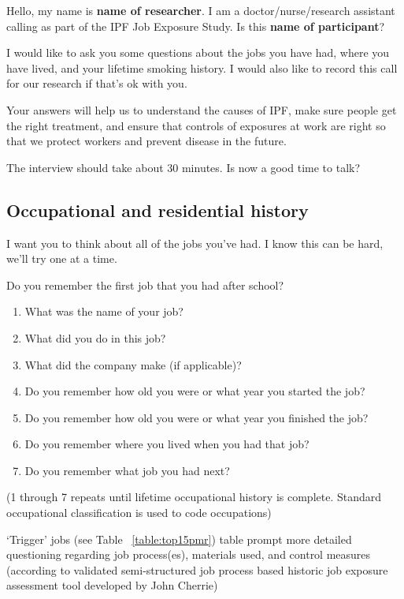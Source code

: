 \documentclass[a4paper,10pt]{article}
\begin{document}
Hello, my name is \textbf{name of researcher}. I am a doctor/nurse/research assistant calling as part of the IPF Job Exposure Study. Is this \textbf{name of participant}? 

I would like to ask you some questions about the jobs you have had, where you have lived, and your lifetime smoking history. I would also like to record this call for our research if that's ok with you.  

Your answers will help us to understand the causes of IPF, make sure people get the right treatment, and ensure that controls of exposures at work are right so that we protect workers and prevent disease in the future.  

The interview should take about 30 minutes. Is now a good time to talk?

\subsection{Occupational and residential history} 

I want you to think about all of the jobs you've had. I know this can be hard, we'll try one at a time. 

Do you remember the first job that you had after school?

\begin{enumerate}
\item  What was the name of your job?
\item  What did you do in this job?
\item  What did the company make (if applicable)?
\item  Do you remember how old you were or what year you started the job?
\item  Do you remember how old you were or what year you finished the job?
\item  Do you remember where you lived when you had that job?
\item  Do you remember what job you had next?
\end{enumerate}

(1 through 7 repeats until lifetime occupational history is complete. Standard occupational classification is used to code occupations)

`Trigger' jobs (see Table ~\ref{table:top15pmr}) table prompt more detailed questioning regarding job process(es), materials used, and control measures (according to validated semi-structured job process based historic job exposure assessment tool developed by John Cherrie)
\end{document}
